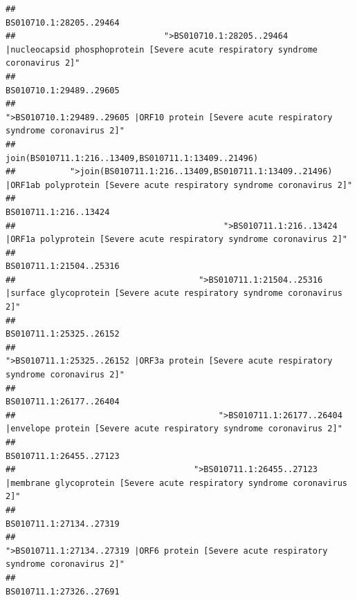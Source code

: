 \documentclass[
]{article}
\begin{document}
\begin{verbatim}
##                                                                                                                BS010710.1:28205..29464 
##                              ">BS010710.1:28205..29464 |nucleocapsid phosphoprotein [Severe acute respiratory syndrome coronavirus 2]" 
##                                                                                                                BS010710.1:29489..29605 
##                                            ">BS010710.1:29489..29605 |ORF10 protein [Severe acute respiratory syndrome coronavirus 2]" 
##                                                                                    join(BS010711.1:216..13409,BS010711.1:13409..21496) 
##           ">join(BS010711.1:216..13409,BS010711.1:13409..21496) |ORF1ab polyprotein [Severe acute respiratory syndrome coronavirus 2]" 
##                                                                                                                  BS010711.1:216..13424 
##                                          ">BS010711.1:216..13424 |ORF1a polyprotein [Severe acute respiratory syndrome coronavirus 2]" 
##                                                                                                                BS010711.1:21504..25316 
##                                     ">BS010711.1:21504..25316 |surface glycoprotein [Severe acute respiratory syndrome coronavirus 2]" 
##                                                                                                                BS010711.1:25325..26152 
##                                            ">BS010711.1:25325..26152 |ORF3a protein [Severe acute respiratory syndrome coronavirus 2]" 
##                                                                                                                BS010711.1:26177..26404 
##                                         ">BS010711.1:26177..26404 |envelope protein [Severe acute respiratory syndrome coronavirus 2]" 
##                                                                                                                BS010711.1:26455..27123 
##                                    ">BS010711.1:26455..27123 |membrane glycoprotein [Severe acute respiratory syndrome coronavirus 2]" 
##                                                                                                                BS010711.1:27134..27319 
##                                             ">BS010711.1:27134..27319 |ORF6 protein [Severe acute respiratory syndrome coronavirus 2]" 
##                                                                                                                BS010711.1:27326..27691 

\end{verbatim}
\end{document}
